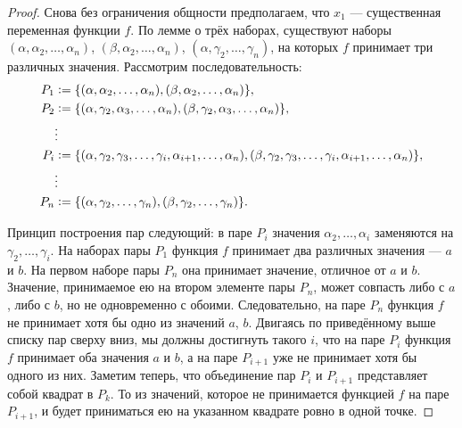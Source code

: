 \begin{proof}
    Снова без ограничения общности предполагаем, что $x_1$ --- существенная переменная функции $f$. По лемме о трёх наборах, существуют наборы $(\alpha, \alpha_2, \ldots, \alpha_n)$, $(\beta, \alpha_2, \ldots, \alpha_n)$, $(\alpha, \gamma_2, \ldots, \gamma_n)$, на которых $f$ принимает три различных значения. Рассмотрим последовательность:
    \begin{align*}
        P_1 &\vcentcolon = \{(\alpha, \alpha_2, \ldots, \alpha_n), (\beta, \alpha_2, \ldots, \alpha_n)\},\\
        P_2 &\vcentcolon = \{(\alpha, \gamma_2, \alpha_3, \ldots, \alpha_n), (\beta, \gamma_2, \alpha_3, \ldots, \alpha_n)\},\\
        &\vdots\\
        P_i &\vcentcolon = \{(\alpha, \gamma_2, \gamma_3, \ldots, \gamma_i, \alpha_{i + 1}, \ldots, \alpha_n), (\beta, \gamma_2, \gamma_3, \ldots, \gamma_i, \alpha_{i + 1}, \ldots, \alpha_n)\},\\
        &\vdots\\
        P_n &\vcentcolon = \{(\alpha, \gamma_2, \ldots, \gamma_n), (\beta, \gamma_2, \ldots, \gamma_n)\}.
    \end{align*}

    Принцип построения пар следующий: в паре $P_i$ значения $\alpha_2, \ldots, \alpha_i$ заменяются на $\gamma_2, \ldots, \gamma_i$. На наборах пары $P_1$ функция $f$ принимает два различных значения --- $a$ и $b$. На первом наборе пары $P_n$ она принимает значение, отличное от $a$ и $b$. Значение, принимаемое ею на втором элементе пары $P_n$, может совпасть либо с $a$, либо с $b$, но не одновременно с обоими. Следовательно, на паре $P_n$ функция $f$ не принимает хотя бы одно из значений $a$, $b$. Двигаясь по приведённому выше списку пар сверху вниз, мы должны достигнуть такого $i$, что на паре $P_i$ функция $f$ принимает оба значения $a$ и $b$, а на паре $P_{i + 1}$ уже не принимает хотя бы одного из них. Заметим теперь, что объединение пар $P_i$ и $P_{i + 1}$ представляет собой квадрат в $P_k$. То из значений, которое не принимается функцией $f$ на паре $P_{i + 1}$, и будет приниматься ею на указанном квадрате ровно в одной точке.
\end{proof}

